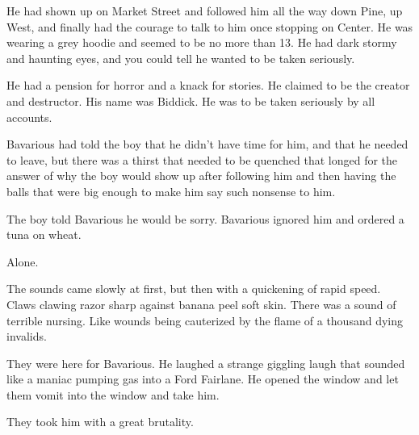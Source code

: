 He had shown up on Market Street and followed him all the way down
Pine, up West, and finally had the courage to talk to him once
stopping on Center. He was wearing a grey hoodie and seemed to be
no more than 13. He had dark stormy and haunting eyes, and you
could tell he wanted to be taken seriously.



He had a pension for horror and a knack for stories. He claimed to
be the creator and destructor. His name was Biddick. He was to be
taken seriously by all accounts.



Bavarious had told the boy that he didn't have time for him,
and that he needed to leave, but there was a thirst that needed to
be quenched that longed for the answer of why the boy would show up
after following him and then having the balls that were big enough
to make him say such nonsense to him.



The boy told Bavarious he would be sorry. Bavarious ignored him and
ordered a tuna on wheat.





Alone.



The sounds came slowly at first, but then with a quickening of
rapid speed. Claws clawing razor sharp against banana peel soft
skin. There was a sound of terrible nursing. Like wounds being
cauterized by the flame of a thousand dying invalids.



They were here for Bavarious. He laughed a strange giggling laugh
that sounded like a maniac pumping gas into a Ford Fairlane. He
opened the window and let them vomit into the window and take
him.



They took him with a great brutality. 

 



